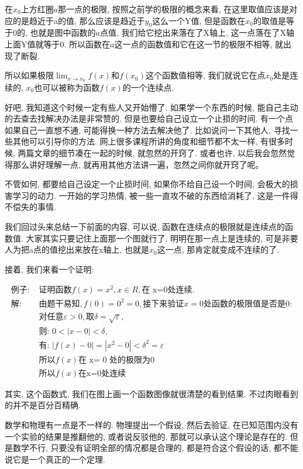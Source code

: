 在$x_0$上方红圈$a$那一点的极限, 按照之前学的极限的概念来看, 在这里取值应该是对应的是趋近于a的值, 那么应该是趋近于$y_0$这么一个Y值, 但是函数在$x_0$的取值是等于0的, 也就是图中函数的$a$点值, 我们给它挖出来落在了X轴上, 这一点落在了X轴上面Y值就等于0. 所以函数在$a$这一点的函数值和它在这一节的极限不相等, 就出现了断裂. 

所以如果极限$\lim_{x \to x_0}f(x)$和$f(x_0)$这个函数值相等, 我们就说它在点$x_0$处是连续的, $x_0$也可以被称为函数$f(x)$的一个连续点. 

好吧, 我知道这个时候一定有些人又开始懵了. 如果学一个东西的时候, 能自己主动的去查去找解决办法是非常赞的. 但是也要给自己设立一个止损的时间. 有一个点如果自己一直想不通, 可能得换一种方法去解决他了. 比如说问一下其他人, 寻找一些其他可以引导你的方法. 网上很多课程所讲的角度和细节都不太一样, 有很多时候, 两篇文章的细节凑在一起的时候, 就忽然的开窍了. 或者也许, 以后我会忽然觉得那么讲好理解一点, 就再用其他方法讲一遍，忽然之间你就开窍了呢。

不管如何, 都要给自己设定一个止损时间, 如果你不给自己设一个时间, 会极大的损害学习的动力. 一开始的学习热情, 被一些一直攻不破的东西给消耗了, 这是一件得不偿失的事情. 

我们回过头来总结一下前面的内容, 可以说, 函数在连续点的极限就是连续点的函数值. 大家其实只要记住上面那一个图就行了. 明明在那一点上是连续的, 可是非要人为把a点的值挖出来放在x轴上, 也就是$x_0$这一点, 那肯定就变成不连续的了. 

接着, 我们来看一个证明: 

\begin{align*}
  \mbox{例子: } & \mbox{证明函数} f(x) = x^2, x \in R, \mbox{在 x=0处连续. } \\
  \mbox{解}: & \mbox{由题干易知}, f(0) = 0^2 = 0, \mbox{接下来验证}x = 0\mbox{处函数的极限值是否是}0: \\
  & \mbox{对任意} \varepsilon > 0, \mbox{取} \delta = \sqrt {\varepsilon},  \\
  & \mbox{则: } 0 < |x-0| < \delta , \\
  & \mbox{有: } |f(x) - 0 | = | x^2 - 0| < \delta ^2 = \varepsilon \\
  & \mbox{所以} f(x)\mbox{在 x= 0 处的极限为0} \\
  & \mbox{所以} f(x)\mbox{在x=0处连续}
\end{align*}

其实, 这个函数式, 我们在图上画一个函数图像就很清楚的看到结果. 不过肉眼看到的并不是百分百精确.

数学和物理有一点是不一样的. 物理提出一个假设, 然后去验证, 在已知范围内没有一个实验的结果是推翻他的, 或者说反驳他的, 那就可以承认这个理论是存在的. 但是数学不行, 只要没有证明全部的情况都是合理的, 都是符合这个假设的话, 都不能说它是一个真正的一个定理. 

